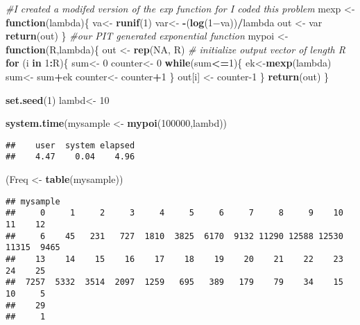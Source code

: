 \documentclass[
]{article}
\newenvironment{Shaded}{\begin{snugshade}}{\end{snugshade}}
\newcommand{\CommentTok}[1]{\textcolor[rgb]{0.56,0.35,0.01}{\textit{#1}}}
\newcommand{\ControlFlowTok}[1]{\textcolor[rgb]{0.13,0.29,0.53}{\textbf{#1}}}
\newcommand{\DecValTok}[1]{\textcolor[rgb]{0.00,0.00,0.81}{#1}}
\newcommand{\KeywordTok}[1]{\textcolor[rgb]{0.13,0.29,0.53}{\textbf{#1}}}
\newcommand{\NormalTok}[1]{#1}
\newcommand{\OperatorTok}[1]{\textcolor[rgb]{0.81,0.36,0.00}{\textbf{#1}}}
\newcommand{\OtherTok}[1]{\textcolor[rgb]{0.56,0.35,0.01}{#1}}
\newcommand{\StringTok}[1]{\textcolor[rgb]{0.31,0.60,0.02}{#1}}
\begin{document}
\begin{Shaded}
\begin{Highlighting}[]
\CommentTok{#I created a modifed version of the exp function for I coded this problem}
\NormalTok{mexp <-}\StringTok{ }\ControlFlowTok{function}\NormalTok{(lambda)\{}
\NormalTok{va<-}\StringTok{ }\KeywordTok{runif}\NormalTok{(}\DecValTok{1}\NormalTok{)}
\NormalTok{var<-}\StringTok{ }\OperatorTok{-}\NormalTok{(}\KeywordTok{log}\NormalTok{(1−va))}\OperatorTok{/}\NormalTok{lambda}
\NormalTok{out <-}\StringTok{ }\NormalTok{var}
\KeywordTok{return}\NormalTok{(out)}
\NormalTok{\}}
\CommentTok{#our PIT generated exponential function}
\NormalTok{mypoi <-}\StringTok{ }\ControlFlowTok{function}\NormalTok{(R,lambda)\{}
\NormalTok{out <-}\StringTok{ }\KeywordTok{rep}\NormalTok{(}\OtherTok{NA}\NormalTok{, R) }\CommentTok{# initialize output vector of length R}
\ControlFlowTok{for}\NormalTok{ (i }\ControlFlowTok{in} \DecValTok{1}\OperatorTok{:}\NormalTok{R)\{}
\NormalTok{  sum<-}\StringTok{ }\DecValTok{0}
\NormalTok{  counter<-}\StringTok{ }\DecValTok{0}
  \ControlFlowTok{while}\NormalTok{(sum}\OperatorTok{<=}\DecValTok{1}\NormalTok{)\{}
\NormalTok{    ek<-}\KeywordTok{mexp}\NormalTok{(lambda)}
\NormalTok{    sum<-}\StringTok{ }\NormalTok{sum}\OperatorTok{+}\NormalTok{ek}
\NormalTok{    counter<-}\StringTok{ }\NormalTok{counter}\OperatorTok{+}\DecValTok{1}
\NormalTok{  \}}
\NormalTok{out[i] <-}\StringTok{ }\NormalTok{counter}\DecValTok{-1}
\NormalTok{\}}
\KeywordTok{return}\NormalTok{(out)}
\NormalTok{\}}


\KeywordTok{set.seed}\NormalTok{(}\DecValTok{1}\NormalTok{)}
\NormalTok{lambd<-}\StringTok{ }\DecValTok{10}


\KeywordTok{system.time}\NormalTok{(mysample <-}\StringTok{ }\KeywordTok{mypoi}\NormalTok{(}\DecValTok{100000}\NormalTok{,lambd))}
\end{Highlighting}
\end{Shaded}

\begin{verbatim}
##    user  system elapsed 
##    4.47    0.04    4.96
\end{verbatim}

\begin{Shaded}
\begin{Highlighting}[]
\NormalTok{(Freq <-}\StringTok{ }\KeywordTok{table}\NormalTok{(mysample))}
\end{Highlighting}
\end{Shaded}

\begin{verbatim}
## mysample
##     0     1     2     3     4     5     6     7     8     9    10    11    12 
##     6    45   231   727  1810  3825  6170  9132 11290 12588 12530 11315  9465 
##    13    14    15    16    17    18    19    20    21    22    23    24    25 
##  7257  5332  3514  2097  1259   695   389   179    79    34    15    10     5 
##    29 
##     1
\end{verbatim}
\end{document}
